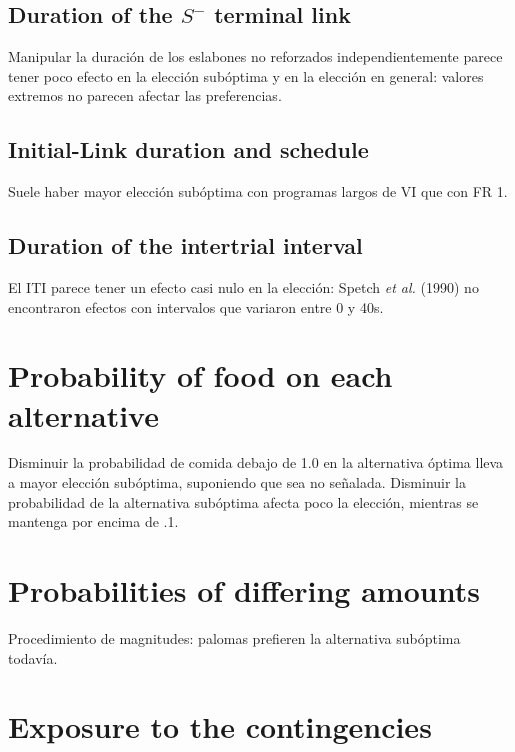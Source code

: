 \documentclass[a4paper,12pt]{article}
\begin{document}
\subsection{Duration of the $S^{-}$ terminal link}

Manipular la duración de los eslabones no reforzados independientemente parece tener poco efecto en la elección subóptima y en la elección en general: valores extremos no parecen afectar las preferencias.

\subsection{Initial-Link duration and schedule}

Suele haber mayor elección subóptima con programas largos de VI que con FR 1.

\subsection{Duration of the intertrial interval}

El ITI parece tener un efecto casi nulo en la elección: Spetch {\itshape et al.} (1990) no encontraron efectos con intervalos que variaron entre 0 y 40s.

\section{Probability of food on each alternative}

Disminuir la probabilidad de comida debajo de 1.0 en la alternativa óptima lleva a mayor elección subóptima, suponiendo que sea no señalada.
Disminuir la probabilidad de la alternativa subóptima afecta poco la elección, mientras se mantenga por encima de .1.

\section{Probabilities of differing amounts}

Procedimiento de magnitudes: palomas prefieren la alternativa subóptima todavía.

\section{Exposure to the contingencies}
\end{document}
